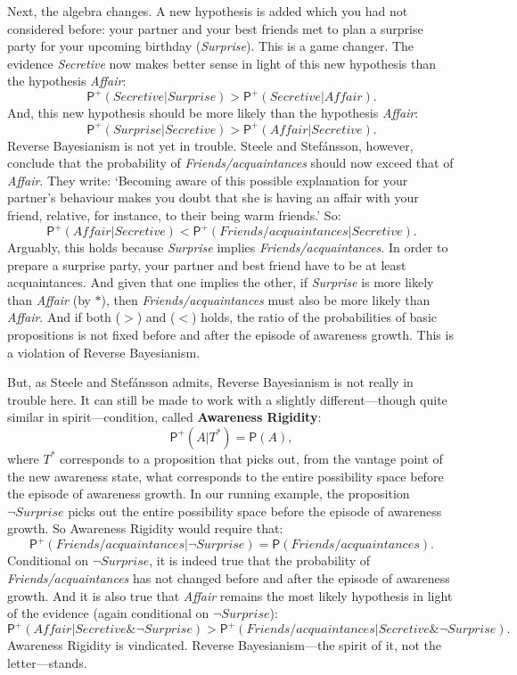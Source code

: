 \documentclass[
  11pt,
  dvipsnames,enabledeprecatedfontcommands]{scrartcl}
\newcommand{\pr}[1]{\ensuremath{\mathsf{P}(#1)}}
\newcommand{\ppr}[2]{\ensuremath{\mathsf{P}^{#1}(#2)}}
\begin{document}
Next, the algebra changes. A new hypothesis is added which you had not
considered before: your partner and your best friends met to plan a
surprise party for your upcoming birthday (\textit{Surprise}). This is a
game changer. The evidence \textit{Secretive} now makes better sense in
light of this new hypothesis than the hypothesis \textit{Affair}:
\[\ppr{+}{ \textit{Secretive} \vert \textit{Surprise}}> \ppr{+}{\textit{Secretive} \vert \textit{Affair}}.\]
And, this new hypothesis should be more likely than the hypothesis
\textit{Affair}:
\[\ppr{+}{ \textit{Surprise} \vert \textit{Secretive}}> \ppr{+}{ \textit{Affair} \vert \textit{Secretive}}. \tag{*}\]
Reverse Bayesianism is not yet in trouble. Steele and Stefánsson,
however, conclude that the probability of \textit{Friends/acquaintances}
should now exceed that of \textit{Affair}. They write: `Becoming aware
of this possible explanation for your partner's behaviour makes you
doubt that she is having an affair with your friend, relative, for
instance, to their being warm friends.' So:
\[\ppr{+}{\textit{Affair} \vert  \textit{Secretive} } < \ppr{+}{\textit{Friends/acquaintances} \vert \textit{Secretive}}. \tag{<}\]
Arguably, this holds because \textit{Surprise} implies
\textit{Friends/acquaintances}. In order to prepare a surprise party,
your partner and best friend have to be at least acquaintances. And
given that one implies the other, if \textit{Surprise} is more likely
than \textit{Affair} (by \(*\)), then \textit{Friends/acquaintances}
must also be more likely than \textit{Affair}. And if both (\(>\)) and
(\(<\)) holds, the ratio of the probabilities of basic propositions is
not fixed before and after the episode of awareness growth. This is a
violation of Reverse Bayesianism.

But, as Steele and Stefánsson admits, Reverse Bayesianism is not really
in trouble here. It can still be made to work with a slightly
different---though quite similar in spirit---condition, called
\textbf{Awareness Rigidity}: \[\ppr{+}{A \vert T^*}=\pr{A},\] where
\(T^*\) corresponds to a proposition that picks out, from the vantage
point of the new awareness state, what corresponds to the entire
possibility space before the episode of awareness growth. In our running
example, the proposition \(\neg\textit{Surprise}\) picks out the entire
possibility space before the episode of awareness growth. So Awareness
Rigidity would require that:
\[\ppr{+}{\textit{Friends/acquaintances} \vert \neg\textit{Surprise}}=\pr{\textit{Friends/acquaintances}}.\]
Conditional on \(\neg\textit{Surprise}\), it is indeed true that the
probability of \textit{Friends/acquaintances} has not changed before and
after the episode of awareness growth. And it is also true that
\textit{Affair} remains the most likely hypothesis in light of the
evidence (again conditional on \(\neg\textit{Surprise}\)):
\[\ppr{+}{\textit{Affair} \vert  \textit{Secretive} \& \neg\textit{Surprise} } > \ppr{+}{\textit{Friends/acquaintances} \vert \textit{Secretive} \& \neg\textit{Surprise}}. \]
Awareness Rigidity is vindicated. Reverse Bayesianism---the spirit of
it, not the letter---stands.
\end{document}
